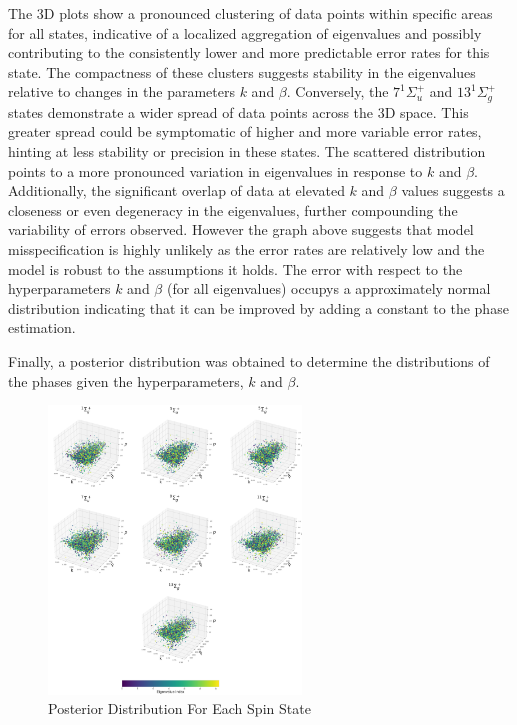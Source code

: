 \documentclass[
]{article}
\begin{document}
The 3D plots show a pronounced clustering of data points within specific
areas for all states, indicative of a localized aggregation of
eigenvalues and possibly contributing to the consistently lower and more
predictable error rates for this state. The compactness of these
clusters suggests stability in the eigenvalues relative to changes in
the parameters \(k\) and \(\beta\). Conversely, the \(7^1\Sigma_u^+\)
and \(13^1\Sigma_g^+\) states demonstrate a wider spread of data points
across the 3D space. This greater spread could be symptomatic of higher
and more variable error rates, hinting at less stability or precision in
these states. The scattered distribution points to a more pronounced
variation in eigenvalues in response to \(k\) and \(\beta\).
Additionally, the significant overlap of data at elevated \(k\) and
\(\beta\) values suggests a closeness or even degeneracy in the
eigenvalues, further compounding the variability of errors observed.
However the graph above suggests that model misspecification is highly
unlikely as the error rates are relatively low and the model is robust
to the assumptions it holds. The error with respect to the
hyperparameters \(k\) and \(\beta\) (for all eigenvalues) occupys a
approximately normal distribution indicating that it can be improved by
adding a constant to the phase estimation.

Finally, a posterior distribution was obtained to determine the
distributions of the phases given the hyperparameters, \(k\) and
\(\beta\).

\begin{figure}[H]
\centering
\caption{Posterior Distribution For Each Spin State}
\includegraphics[width=0.6\textwidth]{tex/posteriorgraph.png}
\end{figure}
\end{document}
